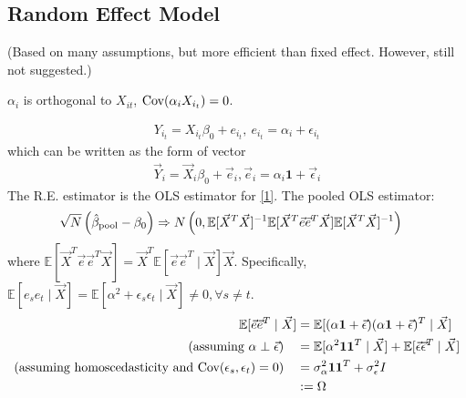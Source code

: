 \documentclass[11pt]{elegantbook}
\begin{document}
\subsection{Random Effect Model}
(Based on many assumptions, but more efficient than fixed effect. However, still not suggested.)
\begin{assumption}
    $\alpha_i$ is orthogonal to $X_{it}$, $\textnormal{Cov}(\alpha_i X_{i_t})=0$.
\end{assumption}
\begin{equation}
    \begin{aligned}
        Y_{i_t}=X_{i_t}\beta_0+e_{i_t},\ e_{i_t}=\alpha_i+\epsilon_{i_t}
    \end{aligned}
    \nonumber
\end{equation}
which can be written as the form of vector
\begin{equation}
    \begin{aligned}
        \vec{Y}_i=\vec{X}_i\beta_0+\vec{e}_i, \vec{e}_i=\alpha_i \mathbf{1}+\vec{\epsilon}_i
    \end{aligned}
    \label{1}
\end{equation}
The R.E. estimator is the OLS estimator for \eqref{1}. The pooled OLS estimator:
\begin{equation}
    \begin{aligned}
        \sqrt{N}\left(\hat{\beta}_\textnormal{pool}-\beta_0\right)&\Rightarrow N\left(0,\mathbb{E}[\vec{X}^T \vec{X}]^{-1}\mathbb{E}[\vec{X}^T \vec{e}\vec{e}^T \vec{X}]\mathbb{E}[\vec{X}^T \vec{X}]^{-1}\right)
    \end{aligned}
    \nonumber
\end{equation}
where $\mathbb{E}[\vec{X}^T \vec{e}\vec{e}^T \vec{X}]=\vec{X}^T \mathbb{E}[\vec{e}\vec{e}^T\mid\vec{X}]\vec{X}$. Specifically, $\mathbb{E}[e_se_t\mid \vec{X}]=\mathbb{E}[\alpha^2+\epsilon_s\epsilon_t\mid \vec{X}]\neq 0, \forall s\neq t$.
\begin{equation}
    \begin{aligned}
        \mathbb{E}[\vec{e}\vec{e}^T\mid\vec{X}]&=\mathbb{E}[(\alpha \mathbf{1}+\vec{\epsilon})(\alpha \mathbf{1}+\vec{\epsilon})^T\mid\vec{X}]\\
        (\textnormal{assuming }\alpha\perp \vec{\epsilon})\quad
        &=\mathbb{E}[\alpha^2 \mathbf{1}\mathbf{1}^T\mid \vec{X}]+\mathbb{E}[\vec{\epsilon}\vec{\epsilon}^T\mid \vec{X}]\\
        (\textnormal{assuming homoscedasticity and Cov}(\epsilon_s,\epsilon_t)=0)\quad &=\sigma_\alpha^2 \mathbf{1}\mathbf{1}^T+\sigma_\epsilon^2 I\\
        &:=\Omega
    \end{aligned}
    \nonumber
\end{equation}
\end{document}
